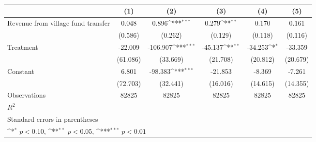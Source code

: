 {
\def\sym#1{\ifmmode^{#1}\else\(^{#1}\)\fi}
\begin{tabular}{l*{5}{c}}
\toprule
                    &\multicolumn{1}{c}{(1)}         &\multicolumn{1}{c}{(2)}         &\multicolumn{1}{c}{(3)}         &\multicolumn{1}{c}{(4)}         &\multicolumn{1}{c}{(5)}         \\
\midrule
Revenue from village fund transfer&       0.048         &       0.896\sym{***}&       0.279\sym{**} &       0.170         &       0.161         \\
                    &     (0.586)         &     (0.262)         &     (0.129)         &     (0.118)         &     (0.116)         \\
\addlinespace
Treatment           &     -22.009         &    -106.907\sym{***}&     -45.137\sym{**} &     -34.253\sym{*}  &     -33.359         \\
                    &    (61.086)         &    (33.669)         &    (21.708)         &    (20.812)         &    (20.679)         \\
\addlinespace
Constant            &       6.801         &     -98.383\sym{***}&     -21.853         &      -8.369         &      -7.261         \\
                    &    (72.703)         &    (32.441)         &    (16.016)         &    (14.615)         &    (14.355)         \\
\midrule
Observations        &       82825         &       82825         &       82825         &       82825         &       82825         \\
\(R^{2}\)           &                     &                     &                     &                     &                     \\
\bottomrule
\multicolumn{6}{l}{\footnotesize Standard errors in parentheses}\\
\multicolumn{6}{l}{\footnotesize \sym{*} \(p<0.10\), \sym{**} \(p<0.05\), \sym{***} \(p<0.01\)}\\
\end{tabular}
}
